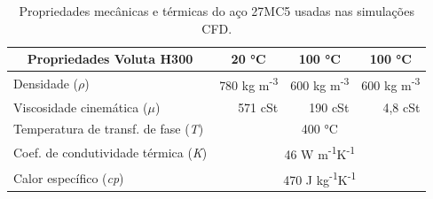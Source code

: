 \begin{table}[htb]
    \centering
    \caption[Propriedades do fluido de têmpera Voluta H300]%
    {Propriedades mecânicas e térmicas do aço 27MC5 usadas nas simulações CFD.}
    \label{tab:Propriedades_VolutaH300}
    \begin{tabular}{lrrr} 
    \toprule
    \multicolumn{1}{c}{\textbf{Propriedades Voluta H300}} & \multicolumn{1}{c}{\textbf{20 °C}} & \multicolumn{1}{c}{\textbf{100 °C}} & \multicolumn{1}{c}{\textbf{100 °C}}  \\ 
    \hline\hline
    Densidade ($\rho$)                                    & 780 kg m\textsuperscript{-3}       & 600 kg m\textsuperscript{-3}        & 600 kg m\textsuperscript{-3}         \\
    Viscosidade cinemática ($\mu$)                        & 571 cSt                            & 190 cSt                             & 4,8 cSt                              \\
    Temperatura de transf. de fase (\textit{T})           & \multicolumn{3}{c}{400 °C}                                                                                      \\
    Coef. de condutividade térmica (\textit{K})           & \multicolumn{3}{c}{46 W m\textsuperscript{-1}K\textsuperscript{-1}}                                             \\
    Calor específico (\textit{cp})                        & \multicolumn{3}{c}{470 J kg\textsuperscript{-1}K\textsuperscript{-1}}                                           \\
    \bottomrule
    \end{tabular}
    \end{table}
